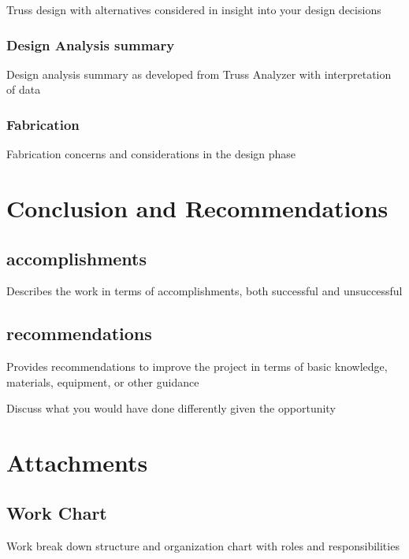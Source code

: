 \documentclass{article}
\let\Oldsection\section
\renewcommand{\section}{\FloatBarrier\Oldsection}
\let\Oldsubsection\subsection
\renewcommand{\subsection}{\FloatBarrier\Oldsubsection}
\let\Oldsubsubsection\subsubsection
\renewcommand{\subsubsection}{\FloatBarrier\Oldsubsubsection}
\begin{document}
Truss design with alternatives considered in insight into your design decisions

\subsubsection{Design Analysis summary}

Design analysis summary as developed from Truss Analyzer with interpretation of data

\subsubsection{Fabrication}

Fabrication concerns and considerations in the design phase

\newpage

\section{Conclusion and Recommendations}

\subsection{accomplishments}

Describes the work in terms of accomplishments, both successful and unsuccessful

\subsection{recommendations}

Provides recommendations to improve the project in terms of basic knowledge, materials, equipment, or other guidance

Discuss what you would have done differently given the opportunity

\newpage

\section{Attachments}

\subsection{Work Chart}

Work break down structure and organization chart with roles and responsibilities

\newpage
\end{document}
